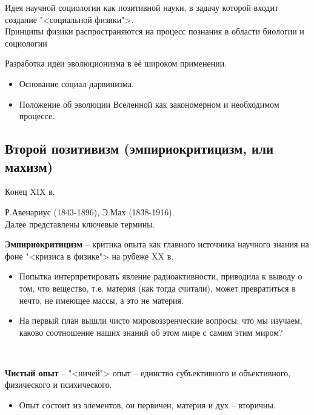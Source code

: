 \documentclass[main.tex]{subfiles}
\begin{document}
{\parindent0pt
Идея научной социологии как позитивной науки, в задачу которой входит создание "<социальной физики">.
}
\ \\

{\parindent0pt
Принципы физики распространяются на процесс познания в области биологии и социологии
}
\ \\

{\parindent0pt
Разработка идеи эволюционизма в её широком применении.
\begin{itemize}[nosep,leftmargin=0.5cm]
\item Основание социал-дарвинизма.
\item Положение об эволюции Вселенной как закономерном и необходимом процессе.
\end{itemize}
}



\subsection{Второй позитивизм (эмпириокритицизм, или махизм)}

{\parindent0pt
Конец XIX в.

Р.Авенариус (1843-1896),
Э.Мах (1838-1916).
\\

Далее представлены ключевые термины.
\\
}

{\parindent0pt
\textbf{Эмпириокритицизм} -- критика опыта как главного источника научного знания на фоне "<кризиса в физике"> на рубеже XX в.
\begin{itemize}[nosep,leftmargin=0.5cm]
\item Попытка интерпретировать явление радиоактивности, приводила к выводу о том, что вещество, т.е. материя (как тогда считали), может превратиться в нечто, не имеющее массы, а это не материя.
\item На первый план вышли чисто мировоззренческие вопросы: что мы изучаем, каково соотношение наших знаний об этом мире с самим этим миром?
\end{itemize}
}
\ 

{\parindent0pt
\textbf{Чистый опыт} -- "<ничей"> опыт -- единство субъективного и объективного, физического и психического.
\begin{itemize}[nosep,leftmargin=0.5cm]
\item Опыт состоит из элементов, он первичен, материя и дух -- вторичны.
\end{itemize}
}
\ 
\end{document}
